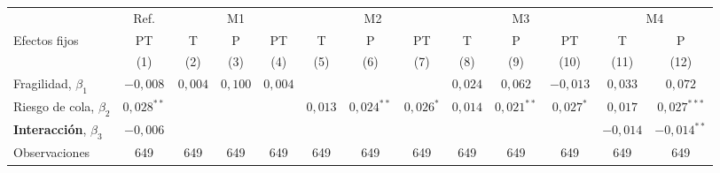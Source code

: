 \begingroup\setlength{\tabcolsep}{3pt}\renewcommand{\arraystretch}{1.3}%
\begin{adjustbox}{max width=0.97\textwidth}
\begin{tabular}{l c ccc ccc ccc cc}
\toprule
 & Ref. & \multicolumn{3}{c}{M1} & \multicolumn{3}{c}{M2} & \multicolumn{3}{c}{M3} & \multicolumn{2}{c}{M4} \\
\cmidrule(lr){2-2}\cmidrule(lr){3-5}\cmidrule(lr){6-8}\cmidrule(lr){9-11}\cmidrule(lr){12-13}
Efectos fijos & PT & T & P & PT & T & P & PT & T & P & PT & T & P \\
 & (1) & (2) & (3) & (4) & (5) & (6) & (7) & (8) & (9) & (10) & (11) & (12) \\
\midrule
Fragilidad, $\beta_1$ & $-0{,}008$ & $0{,}004$ & $0{,}100$ & $0{,}004$ &  &  &  & $0{,}024$ & $0{,}062$ & $-0{,}013$ & $0{,}033$ & $0{,}072$ \\
Riesgo de cola, $\beta_2$ & $0{,}028^{**}$ &  &  &  & $0{,}013$ & $0{,}024^{**}$ & $0{,}026^{*}$ & $0{,}014$ & $0{,}021^{**}$ & $0{,}027^{*}$ & $0{,}017$ & $0{,}027^{***}$ \\
\textbf{Interacción}, $\beta_3$ & $-0{,}006$ &  &  &  &  &  &  &  &  &  & $-0{,}014$ & $-0{,}014^{**}$ \\
\addlinespace
Observaciones & 649 & 649 & 649 & 649 & 649 & 649 & 649 & 649 & 649 & 649 & 649 & 649 \\
\bottomrule
\end{tabular}
\end{adjustbox}\endgroup
